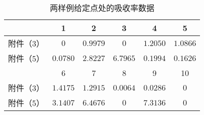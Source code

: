\begin{table}[htbp]
\centering
\caption{两样例给定点处的吸收率数据}
\label{table:absort_rate}
\begin{tabular}{@{}cccccc@{}}
\toprule
      & 1         & 2        & 3         & 4        & 5  \\ \midrule	
附件（3） & $0$ & $0.9979$ & $0$ & $1.2050$ & $1.0866$ \\
附件（5） & $0.0780$  & $2.8227$ & $6.7965$  & $0.1994$ & $0.1626$ \\ \bottomrule
      & 6         & 7        & 8         & 9        & 10  \\ \midrule
附件（3）& $1.4175$ & $1.2915$ & $0.0064$  & $0.0286$ & $0$ \\
附件（5）& $3.1407$ & $6.4676$ & $0$ & $7.3136$ & $0$ \\ \bottomrule
\end{tabular}
\end{table}